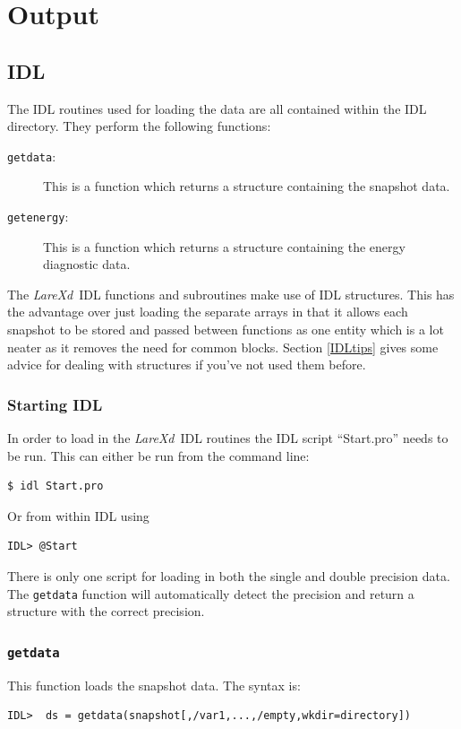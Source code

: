 \documentclass[11pt]{article}
\newcommand{\lare}{{\it LareXd}\ }
\begin{document}
\section{Output}
\subsection{IDL}
The IDL routines used for loading the data are all contained within the IDL directory. They perform the following functions:
\begin{description}
\item[\texttt{getdata}:] This is a function which returns a structure containing the snapshot data.
\item[\texttt{getenergy}:]  This is a function which returns a structure containing the energy diagnostic data.
\end{description}

The \lare IDL functions and subroutines make use of IDL structures. This has the advantage over just loading the separate arrays in that it allows each snapshot to be stored and passed between functions as one entity which is a lot neater as it removes the need for common blocks. Section \ref{IDLtips} gives some advice for dealing with structures if you've not used them before.

\subsubsection{Starting IDL}
In order to load in the \lare IDL routines the IDL script ``Start.pro'' needs to be run. This can either be run from the command line:
\begin{verbatim}
$ idl Start.pro
\end{verbatim}
Or from within IDL using
\begin{verbatim}
IDL> @Start
\end{verbatim}

There is only one script for loading in both the single and double precision data. The \texttt{getdata} function will automatically detect the precision and return a structure with the correct precision.

\subsubsection{\texttt{getdata}}
This function loads the snapshot data. The syntax is:
\begin{verbatim}
IDL>  ds = getdata(snapshot[,/var1,...,/empty,wkdir=directory])
\end{verbatim}
\end{document}
